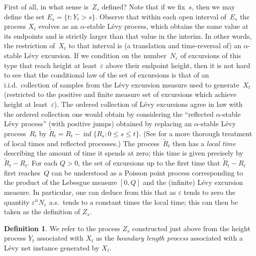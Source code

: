 \documentclass[JEP,XML,SOM,Unicode]{cedram}
\let\epsilon\varepsilon
\theoremstyle{plain}
\numberwithin{theorem}{section}
\theoremstyle{definition}
\newtheorem{definition}[theorem]{Definition}
\let\wt\widetilde
\begin{document}
First of all, in what sense is~$Z_s$ defined? Note that if we fix~$s$, then we may define the set $E_s = \{t : Y_t > s \}$. Observe that within each open interval of~$E_s$ the process $X_t$ evolves as an $\alpha$-stable Lévy process, which obtains the same value at its endpoints and is strictly larger than that value in the interim. In other words, the restriction of~$X_t$ to that interval is (a translation and time-reversal of) an $\alpha$-stable Lévy excursion. If we condition on the number~$N_\epsilon$ of excursions of this type that reach height at least~$\epsilon$ above their endpoint height, then it is not hard to see that the conditional law of the set of excursions is that of an i.i.d.\ collection of samples from the Lévy excursion measure used to generate~$X_t$ (restricted to the positive and finite measure set of excursions which achieve height at least~$\epsilon$). The ordered collection of Lévy excursions agree in law with the ordered collection one would obtain by considering the ``reflected $\alpha$-stable Lévy process'' (with positive jumps) obtained by replacing an $\alpha$-stable Lévy process~$R_t$ by $\wt{R}_t = R_t - \inf \{R_s: 0 \leq s \leq t \}$. (See \cite{bertoinlevybook} for a more thorough treatment of local times and reflected processes.) The process~$\wt{R}_t$ then has a \emph{local time} describing the amount of time it spends at zero; this time is given precisely by $\wt{R}_t - R_t$. For each $Q > 0$, the set of excursions up to the first time that $\wt{R}_t - R_t$ first reaches~$Q$ can be understood as a Poisson point process corresponding to the product of the Lebesgue measure $[0,Q]$ and the (infinite) Lévy excursion measure. In particular, one can deduce from this that as $\epsilon$ tends to zero the quantity $\epsilon^\alpha N_\epsilon$ a.s.\ tends to a constant times the local time; this can then be taken as the definition of $Z_s$.

\begin{definition}
\label{def::levycb}
We refer to the process $Z_s$ constructed just above from the height process $Y_t$ associated with $X_t$ as the \emph{boundary length process} associated with a Lévy net instance generated by $X_t$.
\end{definition}
\end{document}
